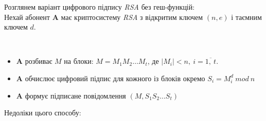 Розглянем варіант цифрового підпису \textit{RSA} без геш-функцій:\\
Нехай абонент \textbf{A} має криптосистему \textit{RSA} з відкритим ключем \( \left( n, e \right) \) і таємним ключем \( d \).
\begin{algorithm}\ 
\begin{itemize}
\item \textbf{A} розбиває \( M \) на блоки: \( M = M_1 M_2 \dots M_t \), де \( |M_i|<n,\ i = \overline{1,\ t} \).
\item \textbf{A} обчислює цифровий підпис для кожного із блоків окремо \( S_i = M_i^d\ mod\ n \)
\item \textbf{A} формує підписане повідомлення \( \left(M, S_1 S_2 \dots S_t \right) \)
\end{itemize}
\end{algorithm}
Недоліки цього способу:
